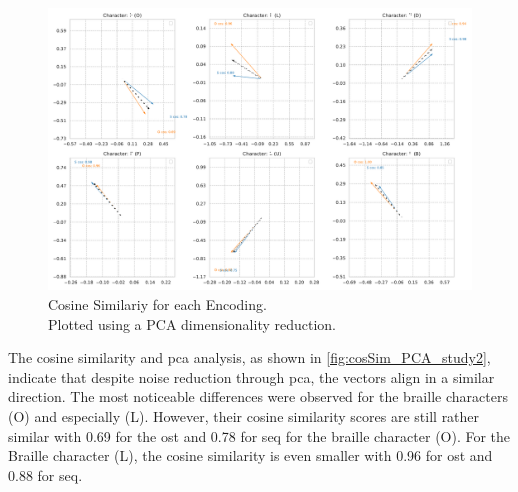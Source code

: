 \begin{figure}
    \centering
    \includegraphics[width=\linewidth]{src/pictures/Study2Data_Experiment/Vectors_study2.pdf}
    \caption{Cosine Similariy for each Encoding.\\Plotted using a PCA dimensionality reduction.}
    \label{fig:cosSim_PCA_study2}
\end{figure}

The cosine similarity and \gls{pca} analysis, as shown in \autoref{fig:cosSim_PCA_study2}, indicate that despite noise reduction through \gls{pca}, the vectors align in a similar direction. The most noticeable differences were observed for the braille characters (O) and especially (L).
However, their cosine similarity scores are still rather similar with 0.69 for the \gls{ost} and 0.78 for \gls{seq} for the braille character (O).
For the Braille character (L), the cosine similarity is even smaller with 0.96 for \gls{ost} and 0.88 for \gls{seq}.